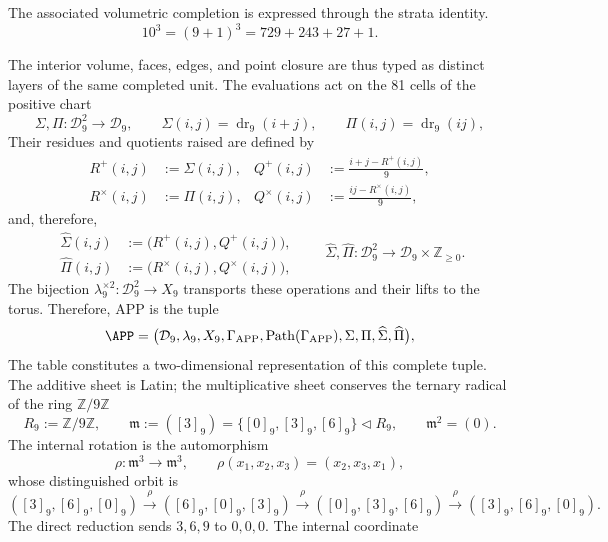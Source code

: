 The associated volumetric completion is expressed through the strata identity.
\begin{equation}
10^3=(9+1)^3=729+243+27+1.
\label{p12-83-c3-s1:eq:completion-unit}
\end{equation}

The interior volume, faces, edges, and point closure are thus
typed as distinct layers of the same completed unit. The evaluations act on the 81
cells of the positive chart
\[
\Sigma,\Pi:\mathcal D_9^2\longrightarrow\mathcal D_9,
\qquad
\Sigma(i,j)=\operatorname{dr}_9(i+j),
\qquad
\Pi(i,j)=\operatorname{dr}_9(ij),
\]
Their residues and quotients raised are defined by
\[
\begin{aligned}
R^+(i,j)&:=\Sigma(i,j),&
Q^+(i,j)&:=\frac{i+j-R^+(i,j)}9,\\
R^\times(i,j)&:=\Pi(i,j),&
Q^\times(i,j)&:=\frac{ij-R^\times(i,j)}9,
\end{aligned}
\]
and, therefore,
\[
\begin{aligned}
\widehat\Sigma(i,j)&:=\bigl(R^+(i,j),Q^+(i,j)\bigr),\\
\widehat\Pi(i,j)&:=\bigl(R^\times(i,j),Q^\times(i,j)\bigr),
\end{aligned}
\qquad
\widehat\Sigma,\widehat\Pi:
\mathcal D_9^2\longrightarrow\mathcal D_9\times\mathbb Z_{\geq0}.
\]
The bijection \(\lambda_9^{\times2}:\mathcal D_9^2\to X_9\) transports
these operations and their lifts to the torus. Therefore, APP is the tuple
\begin{equation}
\APP=\bigl(\mathcal D_9,\lambda_9,X_9,\Gamma_{\rm APP},
\operatorname{Path}(\Gamma_{\rm APP}),
\Sigma,\Pi,\widehat\Sigma,\widehat\Pi\bigr),
\label{p12-83-c3-s1:eq:app-full-definition-public}
\end{equation}
The table constitutes a two-dimensional representation of this complete tuple.
The additive sheet is Latin; the multiplicative sheet conserves
the ternary radical of the ring \(\mathbb Z/9\mathbb Z\)
\begin{equation}
R_9:=\mathbb Z/9\mathbb Z,
\qquad
\mathfrak m:=([3]_9)=\{[0]_9,[3]_9,[6]_9\}\triangleleft R_9,
\qquad \mathfrak m^2=(0).
\label{p12-83-c3-s1:eq:app-radical-369}
\end{equation}
The internal rotation is the automorphism
\[
\rho:\mathfrak m^3\longrightarrow\mathfrak m^3,
\qquad \rho(x_1,x_2,x_3)=(x_2,x_3,x_1),
\]
whose distinguished orbit is
\[
([3]_9,[6]_9,[0]_9)\xrightarrow{\rho}
([6]_9,[0]_9,[3]_9)\xrightarrow{\rho}
([0]_9,[3]_9,[6]_9)\xrightarrow{\rho}
([3]_9,[6]_9,[0]_9).
\]
The direct reduction sends \(3,6,9\) to \(0,0,0\). The internal coordinate
